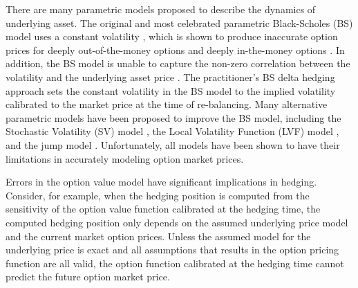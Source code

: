 \documentclass[letterpaper,12pt,titlepage,oneside,final]{book}
\numberwithin{equation}{section}
\theoremstyle{definition}
\begin{document}
There are many parametric models proposed to describe the dynamics of underlying asset.
The original and most celebrated parametric  Black-Scholes (BS) model uses a constant volatility \citep{black1973pricing,merton1973theory}, which is  shown
 to produce inaccurate option prices for deeply out-of-the-money options and deeply in-the-money options \citep{genccay2003degree}.
In addition,
the BS model is unable to capture the non-zero correlation between the volatility and the underlying asset price \citep{french1987expected,bollerslev2006leverage}.
 The practitioner's BS delta hedging approach sets the constant volatility in the BS model to the implied volatility calibrated to the market price at the time of re-balancing.  Many alternative parametric models have been proposed to improve the BS model,  including  the Stochastic Volatility (SV) model \cite{hagan2002managing,heston1993closed,hull1987pricing,bakshi1997empirical},  the Local Volatility Function (LVF) model \citep{coleman2001,dumas1998implied,rubinstein1994implied,dupire1994pricing}, and the jump model \citep{He06,kou2002jump}. Unfortunately, all models have been shown to have their limitations in accurately modeling option market prices.

Errors in  the option value model have significant implications in hedging. Consider, for example, when the hedging position is computed from the sensitivity of the  option value function calibrated at the hedging time, the computed hedging position only depends on the assumed underlying price model and the current market option prices. Unless the assumed model for the underlying price is exact and all assumptions that results in the option pricing function are all valid, the option function calibrated at the hedging time cannot predict the future option market price.
\end{document}
